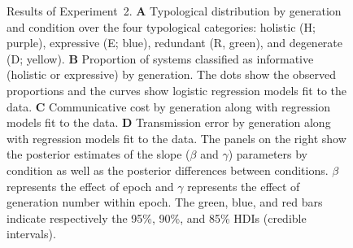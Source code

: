 \documentclass[doc,biblatex]{apa7}
\begin{document}
	\begin{figure}
	\vspace*{2pt}
	\caption{Results of Experiment~2. \textbf{A} Typological distribution by generation and condition over the four typological categories: holistic (H; purple), expressive (E; blue), redundant (R, green), and degenerate (D; yellow). \textbf{B} Proportion of systems classified as informative (holistic or expressive) by generation. The dots show the observed proportions and the curves show logistic regression models fit to the data. \textbf{C} Communicative cost by generation along with regression models fit to the data. \textbf{D} Transmission error by generation along with regression models fit to the data. The panels on the right show the posterior estimates of the slope ($\beta$ and $\gamma$) parameters by condition as well as the posterior differences between conditions. $\beta$ represents the effect of epoch and $\gamma$ represents the effect of generation number within epoch. The green, blue, and red bars indicate respectively the 95\%, 90\%, and 85\% HDIs (credible intervals).}
	\label{fig11}
	\end{figure}
\end{document}
